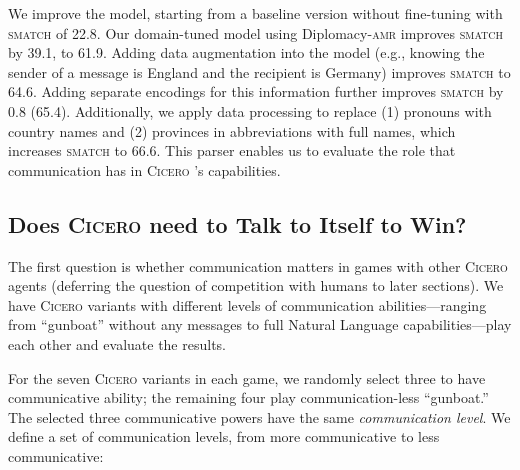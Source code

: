 \documentclass[oneside]{memoir}
\newcommand{\cicero}{\abr{Cicero} }
\newcommand{\abr}[1]{\textsc{#1}}
\begin{document}
We improve the model, starting from a baseline version without
fine-tuning with \abr{smatch} of 22.8.
%
Our domain-tuned model using Diplomacy-\abr{amr} improves \abr{smatch}
by 39.1, to 61.9.
%
Adding data augmentation into the model (e.g., knowing the sender of a
message is England and the recipient is Germany) improves \abr{smatch} to 64.6.
%
Adding separate encodings for this information further improves
\abr{smatch} by 0.8 (65.4).
%
Additionally, we apply data processing to replace (1) pronouns with country names and (2) provinces in abbreviations with full names, which increases \abr{smatch} to 66.6.
%
This parser enables us to evaluate the role that communication has in
\cicero{}'s capabilities.

\subsection{Does \cicero{} need to Talk to Itself to Win?}
\label{sec:Comp_comp_games}


%

The first question is whether communication matters in games with other \cicero{} agents (deferring the question of competition with humans to later sections).
We have \cicero{} variants with different levels of communication abilities---ranging from ``gunboat'' without any messages to full Natural Language capabilities---play each other and evaluate the results.


For the seven \cicero{} variants in each game, we randomly select three to have communicative
ability; the remaining four play communication-less ``gunboat.''
%
The selected three communicative powers have the same
\textit{communication level}. 
%
We define a set of communication
levels, from more communicative to less
communicative:
\end{document}
